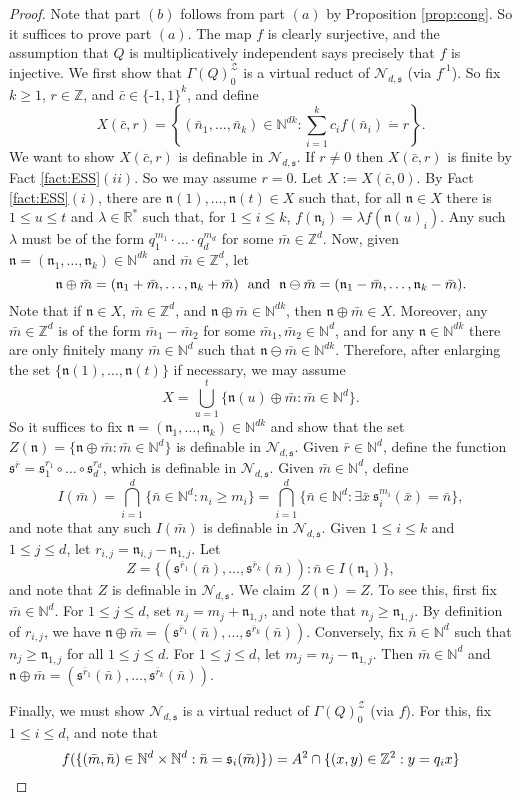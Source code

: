 \documentclass{amsart}
\def\inv{^{\text{-}1}}
\newcommand{\nv}{\text{-}}
\newcommand{\cbar}{\bar{c}}
\newcommand{\mbar}{\bar{m}}
\newcommand{\nbar}{\bar{n}}
\newcommand{\rbar}{\bar{r}}
\newcommand{\xbar}{\bar{x}}
\newcommand{\ms}{\mathfrak{s}}
\newcommand{\kn}{\mathfrak{n}}
\newcommand{\de}{\mathbin{\dot{=}}}
\newcommand{\mand}{\makebox[.4in]{and}}
\newcommand{\cN}{\mathcal{N}}
\newcommand{\cZ}{\mathcal{Z}}
\def\N{\mathbb N}
\def\R{\mathbb R}
\def\Z{\mathbb Z}
\theoremstyle{definition}
\begin{document}
\begin{proof}
Note that part $(b)$ follows from part $(a)$ by Proposition \ref{prop:cong}. So it suffices to prove part $(a)$.  The map $f$ is clearly surjective, and the assumption that $Q$ is multiplicatively independent says 
precisely that $f$ is injective. We first show that $\Gamma(Q)_0^{\cZ}$ is a virtual reduct of $\cN_{d,\ms}$ (via $f\inv$). So fix $k\geq 1$, $r\in\Z$, and $\cbar\in\{\nv 1,1\}^k$, and define 
\[
X(\cbar,r)=\left\{(\nbar_1,\ldots,\nbar_k)\in\N^{dk}:\sum_{i=1}^k c_if(\nbar_i)\de r\right\}.
\]
We want to show $X(\cbar,r)$ is definable in $\cN_{d,\ms}$. If $r\neq 0$ then $X(\cbar,r)$ is finite by Fact \ref{fact:ESS}$(ii)$. So we may assume $r=0$. Let $X:=X(\cbar,0)$.  By Fact \ref{fact:ESS}$(i)$, there are $\kn(1),\ldots,\kn(t)\in X$ such that, for all $\kn\in X$ there is $1\leq u\leq t$ and $\lambda\in\R^*$ such that, for $1\leq i\leq k$, $f(\kn_i)=\lambda f(\kn(u)_i)$.  Any such $\lambda$ must be of the form $q_1^{m_1}\cdot\ldots\cdot q_d^{m_d}$ for some $\mbar\in\Z^d$.  Now, given $\kn=(\kn_1,\ldots,\kn_k)\in \N^{dk}$ and $\mbar\in\Z^d$, let 
\[
\kn\oplus \mbar=(\kn_1+\mbar,\ldots,\kn_k+\mbar)\mand \kn\ominus \mbar=(\kn_1-\mbar,\ldots,\kn_k-\mbar).
\] 
Note that if $\kn \in X$, $\mbar\in \Z^d$, and $\kn\oplus\mbar\in\N^{dk}$, then $\kn\oplus\mbar\in X$.  Moreover, any $\mbar\in\Z^d$ is of the form $\mbar_1-\mbar_2$ for some $\mbar_1,\mbar_2\in\N^d$, and for any $\kn\in\N^{dk}$ there are only finitely many $\mbar\in\N^d$ such that $\kn\ominus\mbar\in\N^{dk}$. Therefore, after enlarging the set $\{\kn(1),\ldots,\kn(t)\}$ if necessary, we may assume 
\[
X=\bigcup_{u=1}^t\{\kn(u)\oplus \mbar:\mbar\in\N^d\}.
\]
So it suffices to fix $\kn=(\kn_1,\ldots,\kn_k)\in\N^{dk}$  and show that the set $Z(\kn)=\{\kn\oplus \mbar:\mbar\in\N^d\}$ is definable in $\cN_{d,\ms}$. Given $\rbar\in\N^d$, define the function $\ms^{\rbar}=\ms_1^{r_1}\circ\ldots\circ\ms_d^{r_d}$, which is definable in $\cN_{d,\ms}$. Given $\mbar\in\N^d$, define 
\[
I(\mbar)=\bigcap_{i=1}^d\{\nbar\in\N^d:n_i\geq m_i\}=\bigcap_{i=1}^d\{\nbar\in\N^d:\exists \xbar~\ms_i^{m_i}(\xbar)= \nbar\},
\] 
and note that any such $I(\mbar)$ is definable in $\cN_{d,\ms}$. Given $1\leq i\leq k$ and $1\leq j\leq d$, let $r_{i,j}=\kn_{i,j}-\kn_{1,j}$. Let
\[
Z=\{(\ms^{\rbar_1}(\nbar),\ldots,\ms^{\rbar_k}(\nbar)):\nbar\in I(\kn_1)\},
\]
and note that $Z$ is definable in $\cN_{d,\ms}$. We claim $Z(\kn)=Z$. To see this, first fix $\mbar\in\N^d$. For $1\leq j\leq d$, set $n_j=m_j+\kn_{1,j}$, and note that $n_j\geq\kn_{1,j}$. By definition of $r_{i,j}$, we have $\kn\oplus\mbar=(\ms^{\rbar_1}(\nbar),\ldots,\ms^{\rbar_k}(\nbar))$. 
Conversely, fix $\nbar\in\N^d$ such that $n_j\geq\kn_{1,j}$ for all $1\leq j\leq d$. For $1\leq j\leq d$, let $m_j=n_j-\kn_{1,j}$. Then $\mbar\in\N^d$ and $\kn\oplus\mbar=(\ms^{\rbar_1}(\nbar),\ldots,\ms^{\rbar_k}(\nbar))$.

Finally, we must show $\cN_{d,\ms}$ is a virtual reduct of $\Gamma(Q)_0^{\cZ}$ (via $f$). For this, fix $1\leq i\leq d$, and note that
\[
f(\{(\mbar,\nbar)\in\N^d\times\N^d:\nbar=\ms_i(\mbar)\})=A^2\cap\{(x,y)\in\Z^2:y=q_ix\}\qedhere
\]
\end{proof}
\end{document}

